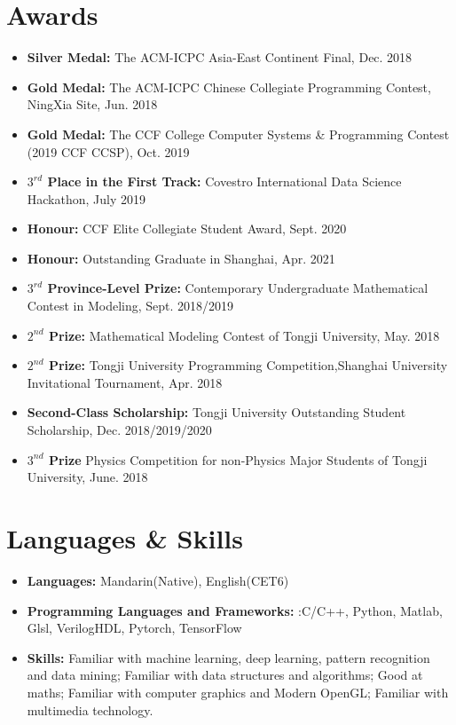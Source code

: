 \documentclass[letterpaper,11pt]{article}
\newcommand{\resumeItem}[2]{
  \item\small{
    \textbf{#1}{ #2 \vspace{-2pt}}
  }
}
\newcommand{\resumeSubItem}[2]{\resumeItem{#1}{#2}\vspace{-4pt}}
\newcommand{\resumeSubHeadingListStart}{\begin{itemize}[leftmargin=*]}
\newcommand{\resumeSubHeadingListEnd}{\end{itemize}}
\begin{document}
\begin{spacing}{1}
 \section{Awards}
 \resumeSubHeadingListStart
    \resumeSubItem{Silver Medal:}
    {The ACM-ICPC Asia-East Continent Final,}
    {Dec. 2018}
    \resumeSubItem{Gold Medal:}
    {The ACM-ICPC Chinese Collegiate Programming Contest, NingXia Site,}
    {Jun. 2018}
    \resumeSubItem{Gold Medal:}
    {The CCF College Computer Systems \& Programming Contest (2019 CCF CCSP),}
    {Oct. 2019}
    \resumeSubItem{$3^{rd}$ Place in the First Track:}
    {Covestro International Data Science Hackathon,}
    {July 2019}
    \resumeSubItem{Honour:}
    {CCF Elite Collegiate Student Award,}
    {Sept. 2020}
    \resumeSubItem{Honour:}
    {Outstanding Graduate in Shanghai,}
    {Apr. 2021}
    \resumeSubItem{$3^{rd}$ Province-Level Prize:}
    {Contemporary Undergraduate Mathematical Contest in Modeling,}
    {Sept. 2018/2019}
    \resumeSubItem{$2^{nd}$ Prize:}
    {Mathematical Modeling Contest of Tongji University,}
    {May. 2018}
    \resumeSubItem{$2^{nd}$ Prize:}
    {Tongji University Programming Competition,Shanghai University Invitational Tournament,}
    {Apr. 2018}
    \resumeSubItem{Second-Class Scholarship:}
    {Tongji University Outstanding Student Scholarship,}
    {Dec. 2018/2019/2020}
    
    \resumeSubItem{$3^{nd}$ Prize}
    {Physics Competition for non-Physics Major Students of Tongji University,}
    {June. 2018}
 \resumeSubHeadingListEnd
\section{Languages \& Skills}
 \resumeSubHeadingListStart
 \resumeSubItem{Languages:}{Mandarin(Native), English(CET6)}
 \resumeSubItem{Programming Languages and Frameworks:}{:C/C++, Python, Matlab, Glsl, VerilogHDL, Pytorch, TensorFlow}
 \resumeSubItem{Skills:}
 {Familiar with machine learning, deep learning, pattern recognition and data mining; Familiar with data structures and algorithms; Good at maths; Familiar with computer graphics and Modern OpenGL; Familiar with multimedia technology.}
\clearpage
 \resumeSubHeadingListEnd
\end{spacing}
\end{document}
